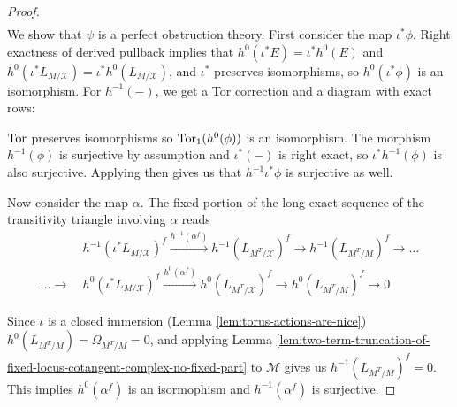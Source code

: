 \begin{proof}
\begin{align*}
  \end{align*}
  We show that \(\psi\) is a perfect obstruction theory. First consider the map \(\iota^*\phi\). Right exactness of derived pullback implies that \(h^0(\iota^*E) = \iota^*h^0(E)\) and \(h^0(\iota^*L_{M/\mathcal X}) = \iota^*h^0(L_{M/\mathcal X})\), and \(\iota^*\) preserves isomorphisms, so \(h^0(\iota^*\phi)\) is an isomorphism. For \(h^{-1}(-)\), we get a Tor correction and a diagram with exact rows:
  \begin{center}
  \end{center}
  \(\operatorname{Tor}\) preserves isomorphisms so \(\operatorname{Tor}_1(h^0(\phi))\) is an isomorphism. The morphism \(h^{-1}(\phi)\) is surjective by assumption and \(\iota^*(-)\) is right exact, so \(\iota^*h^{-1}(\phi)\) is also surjective. Applying \cite[Lemma 05QA]{stacks-project} then gives us that \(h^{-1}\iota^*\phi\) is surjective as well.

  Now consider the map \(\alpha\). The fixed portion of the long exact sequence of the transitivity triangle involving \(\alpha\) reads
  \begin{align*}
    &h^{-1}(\iota^*L_{M/\mathcal X})^f \xrightarrow{h^{-1}(\alpha^f)}h^{-1}(L_{M^T/\mathcal X})^f \to h^{-1}(L_{M^T/M})^f \to \dots\\\dots \to ~& h^{0}(\iota^*L_{M/\mathcal X})^f \xrightarrow{h^{0}(\alpha^f)}h^{0}(L_{M^T/\mathcal X})^f \to h^{0}(L_{M^T/M})^f \to 0
  \end{align*}
  

  Since \(\iota\) is a closed immersion (Lemma \ref{lem:torus-actions-are-nice}) \(h^0(L_{M^T/M}) = \Omega_{M^T/M} = 0\), and applying Lemma \ref{lem:two-term-truncation-of-fixed-locus-cotangent-complex-no-fixed-part} to \(\mathcal M\) gives us \(h^{-1}(L_{M^T/M})^f = 0\). This implies \(h^0(\alpha^f)\) is an isormophism and \(h^{-1}(\alpha^f)\) is surjective.


\end{proof}

